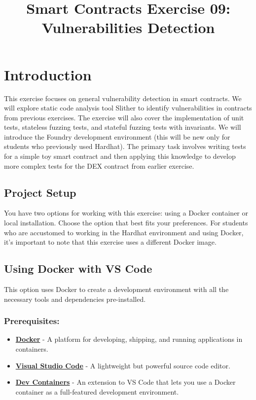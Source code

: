 \documentclass[12pt]{article}
\title{Smart Contracts Exercise 09: \\ Vulnerabilities Detection}
\author{}
\date{}
\begin{document}
\maketitle
\section{Introduction}

This exercise focuses on general vulnerability detection in smart contracts. We
will explore static code analysis tool Slither to identify vulnerabilities
in contracts from previous exercises. The exercise will also cover the
implementation of unit tests, stateless fuzzing tests, and stateful fuzzing
tests with invariants. We will introduce the Foundry development environment
(this will be new only for students who previously used Hardhat). The primary task involves
writing tests for a simple toy smart contract and then applying this knowledge
to develop more complex tests for the DEX contract from earlier exercise.

\subsection*{Project Setup}

You have two options for working with this exercise: using a Docker container
or local installation. Choose the option that best fits your preferences. For
students who are accustomed to working in the Hardhat environment and using
Docker, it's important to note that this exercise uses a different Docker
image.

\subsection{Using Docker with VS Code}

This option uses Docker to create a development environment with all the
necessary tools and dependencies pre-installed.

\subsubsection*{Prerequisites:}

\begin{itemize}
    \item \textbf{\href{https://www.docker.com/products/docker-desktop}{Docker}} - A platform for developing, shipping, and running applications in containers.
    \item \textbf{\href{https://code.visualstudio.com/}{Visual Studio Code}} - A lightweight but powerful source code editor.
    \item \textbf{\href{https://marketplace.visualstudio.com/items?itemName=ms-vscode-remote.remote-containers}{Dev Containers}} - An extension to VS Code that lets you use a Docker container as a full-featured development environment.
\end{itemize}
\end{document}
